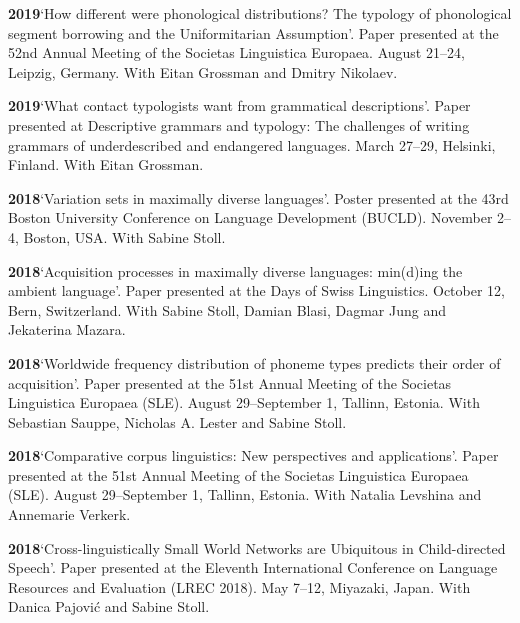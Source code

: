 \documentclass[11pt]{article}
\newcommand{\hangpara}{
 \setlength{\parindent}{0in} %
 \hangindent=0.42in %
}
\begin{document}
\hangpara
\vskip 6pt
{\bf 2019}\hspace{1ex}`How different were phonological distributions?
The typology of phonological segment borrowing and the Uniformitarian
Assumption'. Paper presented at the 52nd Annual Meeting of the Societas Linguistica Europaea. August 21--24, Leipzig, Germany. With Eitan Grossman and Dmitry Nikolaev.

\hangpara
\vskip 6pt
{\bf 2019}\hspace{1ex}`What contact typologists want from grammatical descriptions'. Paper presented at Descriptive grammars and typology: The challenges of writing grammars of underdescribed and endangered languages. March 27--29, Helsinki, Finland. With Eitan Grossman.

\hangpara
\vskip 6pt
{\bf 2018}\hspace{1ex}`Variation sets in maximally diverse languages'. Poster presented at the 43rd Boston University Conference on Language Development (BUCLD). November 2--4, Boston, USA. With Sabine Stoll.

\hangpara
\vskip 6pt
{\bf 2018}\hspace{1ex}`Acquisition processes in maximally diverse languages: min(d)ing the ambient language'. Paper presented at the Days of Swiss Linguistics. October 12, Bern, Switzerland. With Sabine Stoll, Damian Blasi, Dagmar Jung and Jekaterina Mazara.

\vskip 6pt
\hangpara
{\bf 2018}\hspace{1ex}`Worldwide frequency distribution of phoneme types predicts their order of acquisition'. Paper presented at the 51st Annual Meeting of the Societas Linguistica Europaea (SLE). August 29--September 1, Tallinn, Estonia. With Sebastian Sauppe, Nicholas A. Lester and Sabine Stoll.

\vskip 6pt
\hangpara
{\bf 2018}\hspace{1ex}`Comparative corpus linguistics: New perspectives and applications'. Paper presented at the 51st Annual Meeting of the Societas Linguistica Europaea (SLE). August 29--September 1, Tallinn, Estonia. With Natalia Levshina and Annemarie Verkerk.

\vskip 6pt
\hangpara
{\bf 2018}\hspace{1ex}`Cross-linguistically Small World Networks are Ubiquitous in Child-directed Speech'. Paper presented at the Eleventh International Conference on Language Resources and Evaluation (LREC 2018). May 7--12, Miyazaki, Japan. With Danica Pajovi{\'c} and Sabine Stoll.
\end{document}
